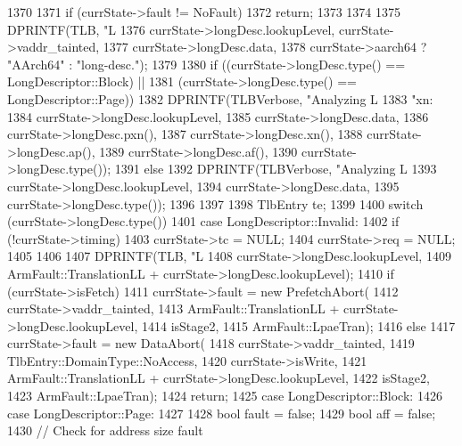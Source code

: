 \begin{DoxyCode}
1370 {
1371     if (currState->fault != NoFault) {
1372         return;
1373     }
1374 
1375     DPRINTF(TLB, "L%
1376             currState->longDesc.lookupLevel, currState->vaddr_tainted,
1377             currState->longDesc.data,
1378             currState->aarch64 ? "AArch64" : "long-desc.");
1379 
1380     if ((currState->longDesc.type() == LongDescriptor::Block) ||
1381         (currState->longDesc.type() == LongDescriptor::Page)) {
1382         DPRINTF(TLBVerbose, "Analyzing L%
1383                 "xn: %
1384                 currState->longDesc.lookupLevel,
1385                 currState->longDesc.data,
1386                 currState->longDesc.pxn(),
1387                 currState->longDesc.xn(),
1388                 currState->longDesc.ap(),
1389                 currState->longDesc.af(),
1390                 currState->longDesc.type());
1391     } else {
1392         DPRINTF(TLBVerbose, "Analyzing L%
1393                 currState->longDesc.lookupLevel,
1394                 currState->longDesc.data,
1395                 currState->longDesc.type());
1396     }
1397 
1398     TlbEntry te;
1399 
1400     switch (currState->longDesc.type()) {
1401       case LongDescriptor::Invalid:
1402         if (!currState->timing) {
1403             currState->tc = NULL;
1404             currState->req = NULL;
1405         }
1406 
1407         DPRINTF(TLB, "L%
1408                 currState->longDesc.lookupLevel,
1409                 ArmFault::TranslationLL + currState->longDesc.lookupLevel);
1410         if (currState->isFetch)
1411             currState->fault = new PrefetchAbort(
1412                 currState->vaddr_tainted,
1413                 ArmFault::TranslationLL + currState->longDesc.lookupLevel,
1414                 isStage2,
1415                 ArmFault::LpaeTran);
1416         else
1417             currState->fault = new DataAbort(
1418                 currState->vaddr_tainted,
1419                 TlbEntry::DomainType::NoAccess,
1420                 currState->isWrite,
1421                 ArmFault::TranslationLL + currState->longDesc.lookupLevel,
1422                 isStage2,
1423                 ArmFault::LpaeTran);
1424         return;
1425       case LongDescriptor::Block:
1426       case LongDescriptor::Page:
1427         {
1428             bool fault = false;
1429             bool aff = false;
1430             // Check for address size fault
}}}
\end{DoxyCode}
